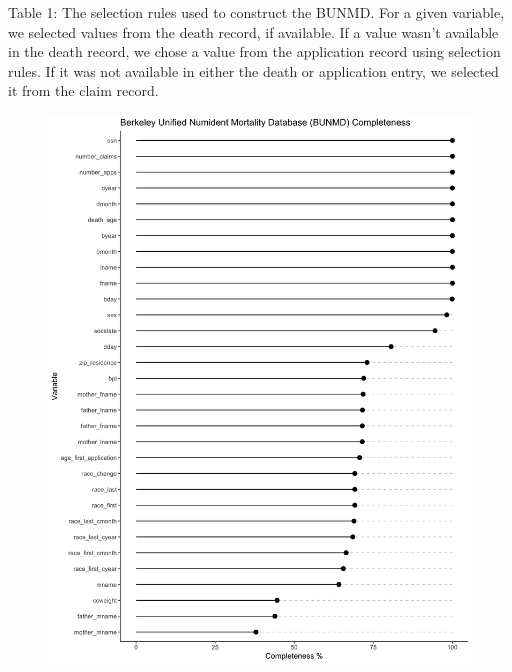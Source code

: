\documentclass[
  11pt,
]{article}
\begin{document}
Table 1: The selection rules used to construct the BUNMD. For a given
variable, we selected values from the death record, if available. If a
value wasn't available in the death record, we chose a value from the
application record using selection rules. If it was not available in
either the death or application entry, we selected it from the claim
record.

\newpage

\begin{figure}
  \centering
  \includegraphics[width = 6.9in]{../illustrations/bunmd_coverage_completeness.png}
  \caption{}
\end{figure}
\end{document}
